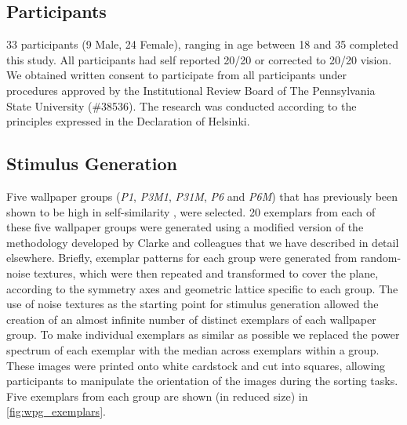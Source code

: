\documentclass[11pt, twoside]{article}
\begin{document}
\subsection*{Participants}
33 participants (9 Male, 24 Female), ranging in age between 18 and 35 completed this study. All participants had self reported 20/20 or corrected to 20/20 vision. We obtained written consent to participate from all participants under procedures approved by the Institutional Review Board of The Pennsylvania State University (\#38536). The research was conducted according to the principles expressed in the Declaration of Helsinki.

\subsection*{Stimulus Generation}
Five wallpaper groups (\textit{P1}, \textit{P3M1}, \textit{P31M}, \textit{P6} and \textit{P6M}) that has previously been shown to be high in self-similarity \citep{RN172}, were selected. 20 exemplars from each of these five wallpaper groups were generated using a modified version of the methodology developed by Clarke and colleagues\citep{RN172} that we have described in detail elsewhere\citep{RN1725}. Briefly, exemplar patterns for each group were generated from random-noise textures, which were then repeated and transformed to cover the plane, according to the symmetry axes and geometric lattice specific to each group. The use of noise textures as the starting point for stimulus generation allowed the creation of an almost infinite number of distinct exemplars of each wallpaper group. To make individual exemplars as similar as possible we replaced the power spectrum of each exemplar with the median across exemplars within a group. These images were printed onto white cardstock and cut into squares, allowing participants to manipulate the orientation of the images during the sorting tasks. Five exemplars from each group are shown (in reduced size) in \ref{fig:wpg_exemplars}. 
\end{document}
